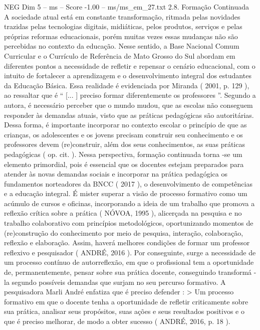 \begin{textsample}{NEG Dim 5 – ms – Score -1.00 – ms/ms\_em\_27.txt}  \label{ex:f5_neg_078}
2.8.
Formação Continuada A sociedade atual está em constante transformação, ritmada pelas novidades trazidas pelas tecnologias digitais, midiáticas, pelos produtos, serviços e pelas próprias reformas educacionais, porém muitas vezes essas mudanças não são percebidas no contexto da educação.
Nesse sentido, a Base Nacional Comum Curricular e o Currículo de Referência de Mato Grosso do Sul abordam em diferentes pontos a necessidade de refletir e repensar o cenário educacional, com o intuito de fortalecer a aprendizagem e o desenvolvimento integral dos estudantes da Educação Básica.
Essa realidade é evidenciada por Miranda ( 2001, p. 129 ), ao ressaltar que é “ [... ] preciso formar diferentemente os professores ”.
Segundo a autora, é necessário perceber que o mundo mudou, que as escolas não conseguem responder às demandas atuais, visto que as práticas pedagógicas são autoritárias.
Dessa forma, é importante incorporar no contexto escolar o princípio de que as crianças, os adolescentes e os jovens precisam construir seu conhecimento e os professores devem (re)construir, além dos seus conhecimentos, as suas práticas pedagógicas ( op. cit. ).
Nessa perspectiva, formação continuada torna -se um elemento primordial, pois é essencial que os docentes estejam preparados para atender às novas demandas sociais e incorporar na prática pedagógica os fundamentos norteadores da BNCC ( 2017 ), o desenvolvimento de competências e a educação integral.
É mister superar a visão de processo formativo como um acúmulo de cursos e oficinas, incorporando a ideia de um trabalho que promova a reflexão crítica sobre a prática ( NÓVOA, 1995 ), alicerçada na pesquisa e no trabalho colaborativo com princípios metodológicos, oportunizando momentos de (re)construção do conhecimento por meio de pesquisa, interação, colaboração, reflexão e elaboração.
Assim, haverá melhores condições de formar um professor reflexivo e pesquisador ( ANDRÉ, 2016 ).
Por conseguinte, surge a necessidade de um processo contínuo de autorreflexão, em que o profissional tem a oportunidade de, permanentemente, pensar sobre sua prática docente, conseguindo transformá -la segundo possíveis demandas que surjam no seu percurso formativo.
A pesquisadora Marli André enfatiza que é preciso defender : > Um processo formativo em que o docente tenha a oportunidade de refletir criticamente sobre sua prática, analisar seus propósitos, suas ações e seus resultados positivos e o que é preciso melhorar, de modo a obter sucesso ( ANDRÉ, 2016, p. 18 ).

\end{textsample}
